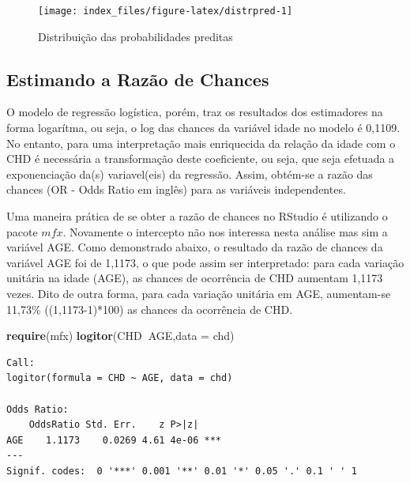\documentclass[12pt,brazil,oneside]{book}
\newenvironment{Shaded}{\begin{snugshade}}{\end{snugshade}}
\newcommand{\DataTypeTok}[1]{\textcolor[rgb]{0.13,0.29,0.53}{#1}}
\newcommand{\KeywordTok}[1]{\textcolor[rgb]{0.13,0.29,0.53}{\textbf{#1}}}
\newcommand{\NormalTok}[1]{#1}
\newcommand{\OperatorTok}[1]{\textcolor[rgb]{0.81,0.36,0.00}{\textbf{#1}}}
\begin{document}
\begin{figure}[H]

{\centering \texttt{[image: index\_files/figure-latex/distrpred-1]} 

}

\caption{Distribuição das probabilidades preditas}\label{fig:distrpred}
\end{figure}

\hypertarget{estimando-a-razao-de-chances}{%
\subsection{Estimando a Razão de
Chances}\label{estimando-a-razao-de-chances}}

O modelo de regressão logística, porém, traz os resultados dos
estimadores na forma logarítma, ou seja, o log das chances da variável
idade no modelo é 0,1109. No entanto, para uma interpretação mais
enriquecida da relação da idade com o CHD é necessária a transformação
deste coeficiente, ou seja, que seja efetuada a exponenciação da(s)
variavel(eis) da regressão. Assim, obtém-se a razão das chances (OR -
Odds Ratio em inglês) para as variáveis independentes.

Uma maneira prática de se obter a razão de chances no RStudio é
utilizando o pacote \(mfx\). Novamente o intercepto não nos interessa
nesta análise mas sim a variável AGE. Como demonstrado abaixo, o
resultado da razão de chances da variável AGE foi de 1,1173, o que pode
assim ser interpretado: para cada variação unitária na idade (AGE), as
chances de ocorrência de CHD aumentam 1,1173 vezes. Dito de outra forma,
para cada variação unitária em AGE, aumentam-se 11,73\% ((1,1173-1)*100)
as chances da ocorrência de CHD.

\begin{Shaded}
\begin{Highlighting}[]
\KeywordTok{require}\NormalTok{(mfx)}
\KeywordTok{logitor}\NormalTok{(CHD}\OperatorTok{~}\NormalTok{AGE,}\DataTypeTok{data =}\NormalTok{ chd)}
\end{Highlighting}
\end{Shaded}

\begin{verbatim}
Call:
logitor(formula = CHD ~ AGE, data = chd)

Odds Ratio:
    OddsRatio Std. Err.    z P>|z|    
AGE    1.1173    0.0269 4.61 4e-06 ***
---
Signif. codes:  0 '***' 0.001 '**' 0.01 '*' 0.05 '.' 0.1 ' ' 1
\end{verbatim}
\end{document}
